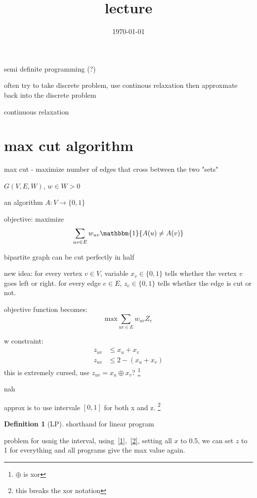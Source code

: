 \documentclass{article}
\title{lecture}
\date{\today}
\theoremstyle{definition}
\newtheorem{definition}{Definition}
\begin{document}
\maketitle

semi definite programming (?)

often try to take discrete problem, use continous relaxation then approxmate back into the discrete problem




continuous relaxation

\section{max cut algorithm}
max cut - maximize number of edges that cross between the two "sets"

\(G(V,E,W)\), \(w\in W>0\)

an algorithm \(A:V\rightarrow\{0,1\}\)

objective: maximize \[\sum_{uv\in E} w_{uv}\mathbbm{1} \{A(u)\neq A(v)\}\]

bipartite graph can be cut perfectly in half

new idea:
for every vertex \(v\in V\), variable \(x_v\in \{0,1\}\) tells whether the vertex \(v\) goes left or right. for every edge \(e\in E\), \(z_e\in \{0,1\}\) tells whether the edge is cut or not. 

objective function becomes:
\begin{equation}\label{2}
    \text{max}\sum_{uv\in E} w_{uv} Z_e
\end{equation}

w constraint: \begin{equation}\label{1}
    \begin{split}
        z_{uv}&\leq x_u+x_v\\
        z_{uv}&\leq 2-(x_u+x_v)
    \end{split}
\end{equation}
this is extremely cursed, use 
\(z_{uv} = x_u\oplus x_v\)?
\footnote{\(\oplus \) is xor}

nah 

approx is to use intervale \([0,1]\) for both x and z. \footnote{this breaks the xor notation}

\begin{definition}[LP]
    shorthand for linear program
\end{definition}

problem for usnig the interval, using~\ref{1},~\ref{2}, setting all \(x\) to 0.5, we can set \(z\) to 1 for everything and all programs give the max value again.
\end{document}
